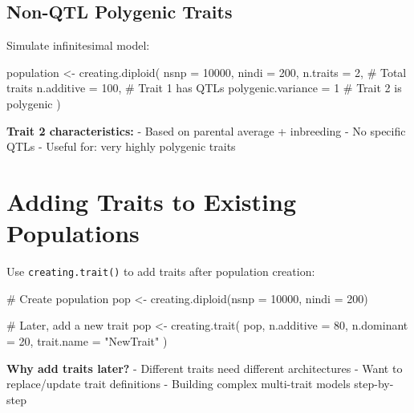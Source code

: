 \documentclass[
  letterpaper,
]{book}
\newenvironment{Shaded}{\begin{snugshade}}{\end{snugshade}}
\newcommand{\AttributeTok}[1]{\textcolor[rgb]{0.40,0.45,0.13}{#1}}
\newcommand{\CommentTok}[1]{\textcolor[rgb]{0.37,0.37,0.37}{#1}}
\newcommand{\DecValTok}[1]{\textcolor[rgb]{0.68,0.00,0.00}{#1}}
\newcommand{\FunctionTok}[1]{\textcolor[rgb]{0.28,0.35,0.67}{#1}}
\newcommand{\NormalTok}[1]{\textcolor[rgb]{0.00,0.23,0.31}{#1}}
\newcommand{\OtherTok}[1]{\textcolor[rgb]{0.00,0.23,0.31}{#1}}
\newcommand{\StringTok}[1]{\textcolor[rgb]{0.13,0.47,0.30}{#1}}
\begin{document}
\subsection{Non-QTL Polygenic Traits}\label{non-qtl-polygenic-traits}

Simulate infinitesimal model:

\begin{Shaded}
\begin{Highlighting}[]
\NormalTok{population }\OtherTok{\textless{}{-}} \FunctionTok{creating.diploid}\NormalTok{(}
  \AttributeTok{nsnp =} \DecValTok{10000}\NormalTok{,}
  \AttributeTok{nindi =} \DecValTok{200}\NormalTok{,}
  \AttributeTok{n.traits =} \DecValTok{2}\NormalTok{,              }\CommentTok{\# Total traits}
  \AttributeTok{n.additive =} \DecValTok{100}\NormalTok{,          }\CommentTok{\# Trait 1 has QTLs}
  \AttributeTok{polygenic.variance =} \DecValTok{1}     \CommentTok{\# Trait 2 is polygenic}
\NormalTok{)}
\end{Highlighting}
\end{Shaded}

\textbf{Trait 2 characteristics:} - Based on parental average +
inbreeding - No specific QTLs - Useful for: very highly polygenic traits

\section{Adding Traits to Existing Populations}\label{sec-add-traits}

Use \texttt{creating.trait()} to add traits after population creation:

\begin{Shaded}
\begin{Highlighting}[]
\CommentTok{\# Create population}
\NormalTok{pop }\OtherTok{\textless{}{-}} \FunctionTok{creating.diploid}\NormalTok{(}\AttributeTok{nsnp =} \DecValTok{10000}\NormalTok{, }\AttributeTok{nindi =} \DecValTok{200}\NormalTok{)}

\CommentTok{\# Later, add a new trait}
\NormalTok{pop }\OtherTok{\textless{}{-}} \FunctionTok{creating.trait}\NormalTok{(}
\NormalTok{  pop,}
  \AttributeTok{n.additive =} \DecValTok{80}\NormalTok{,}
  \AttributeTok{n.dominant =} \DecValTok{20}\NormalTok{,}
  \AttributeTok{trait.name =} \StringTok{"NewTrait"}
\NormalTok{)}
\end{Highlighting}
\end{Shaded}

\textbf{Why add traits later?} - Different traits need different
architectures - Want to replace/update trait definitions - Building
complex multi-trait models step-by-step
\end{document}
